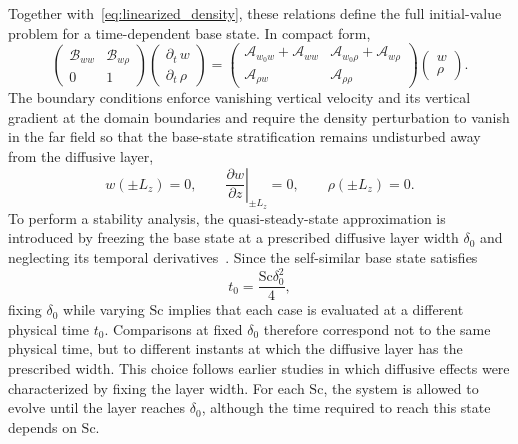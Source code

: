 \documentclass[11pt]{article}
\newcommand{\Sch}{\mathrm{Sc}}
\begin{document}
Together with~\eqref{eq:linearized_density}, these relations define the full initial-value problem
for a time-dependent base state. In compact form,
\begin{equation}
    \label{eq:linearized_continuous_system}
    \begin{pmatrix}
        \mathscr{B}_{ww} & \mathscr{B}_{w\rho} \\
        0 & 1
    \end{pmatrix}
    \begin{pmatrix}
        \partial_t\, w \\[4pt]
        \partial_t\,\rho
    \end{pmatrix}
    =
    \begin{pmatrix}
        \mathscr{A}_{w_0w}+\mathscr{A}_{ww} & \mathscr{A}_{w_0\rho}+\mathscr{A}_{w\rho} \\[4pt]
        \mathscr{A}_{\rho w} & \mathscr{A}_{\rho\rho}
    \end{pmatrix}
    \begin{pmatrix}
        w \\[4pt]
        \rho
    \end{pmatrix}.
\end{equation}
The boundary conditions enforce vanishing vertical velocity and its vertical gradient at the domain boundaries and require the density perturbation to vanish in the far field so that the base-state stratification remains undisturbed away from the diffusive layer,
\begin{equation}
    w(\pm L_z) = 0, \qquad \left.\frac{\partial w}{\partial z}\right|_{\pm L_z} = 0, \qquad \rho(\pm L_z) = 0.
\end{equation}
To perform a stability analysis, the quasi-steady-state approximation is introduced by freezing the base state at a prescribed diffusive layer width \(\delta_0\) and neglecting its temporal derivatives~\citep{junhao-et-al-2006}. Since the self-similar base state satisfies
\begin{equation}
    t_0 = \frac{\Sch \delta_0^2}{4},
\end{equation}
fixing \(\delta_0\) while varying \(\Sch\) implies that each case is evaluated at a different physical time \(t_0\). Comparisons at fixed \(\delta_0\) therefore correspond not to the same physical time, but to different instants at which the diffusive layer has the prescribed width. This choice follows earlier studies in which diffusive effects were characterized by fixing the layer width. For each \(\Sch\), the system is allowed to evolve until the layer reaches \(\delta_0\), although the time required to reach this state depends on \(\Sch\).
\end{document}
